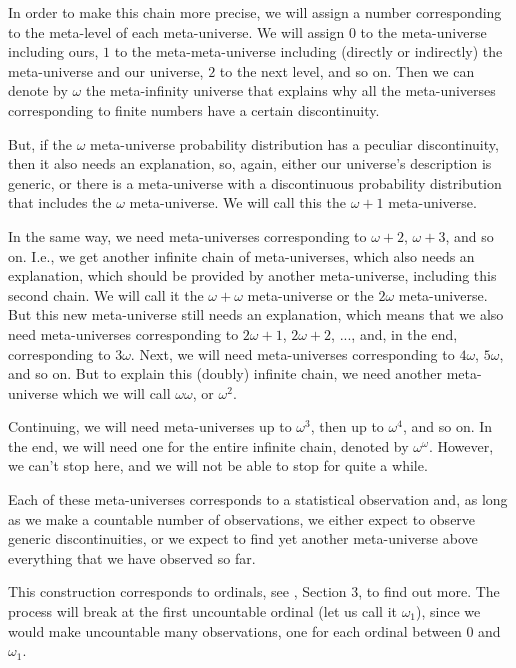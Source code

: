 \documentclass[a4paper
,draft
]{article}
\begin{document}
In order to make this chain more precise, we will assign a number corresponding
to the meta-level of each meta-universe.
We will assign $0$ to the meta-universe including ours, $1$ to the
meta-meta-universe including (directly or indirectly) the meta-universe and our
universe, $2$ to the next level, and so on.
Then we can denote by $\omega$ the meta-infinity universe that explains why all
the meta-universes corresponding to finite numbers have a certain discontinuity.

But, if the $\omega$ meta-universe probability distribution has a peculiar
discontinuity, then it also needs an explanation, so, again,
either our universe's
description is generic, or there is a meta-universe with a discontinuous
probability distribution that includes the
$\omega$ meta-universe.
We will call this the $\omega + 1$ meta-universe.

In the same way, we need meta-universes corresponding to $\omega + 2$,
$\omega + 3$, and so on.
I.e., we get another infinite chain of meta-universes, which also needs an
explanation, which should be provided by another meta-universe, including this
second chain. We will call it the $\omega + \omega$ meta-universe
or the $2\omega$ meta-universe.
But this new meta-universe still needs an explanation,
which means that we also need
meta-universes corresponding to $2\omega + 1$, $2\omega + 2$, ..., and,
in the end, corresponding to $3\omega$.
Next, we will need meta-universes
corresponding to $4\omega$, $5\omega$, and so on.
But to explain this (doubly) infinite chain,
we need another meta-universe which we
will call $\omega\omega$, or $\omega^2$.

Continuing, we will need meta-universes up to $\omega^3$, then up to
$\omega^4$, and so on.
In the end, we will need one for the entire
infinite chain, denoted by $\omega^\omega$.
However, we can't stop here, and we will not be able to stop for quite a while.

Each of these meta-universes corresponds to a statistical observation and,
as long as we make a countable number of observations, we either expect to
observe generic discontinuities, or we expect to find yet another meta-universe
above everything that we have observed so far.

This construction corresponds to ordinals, see \textcite{Cohen1966}, Section 3,
to find out more.
The process will break at the first uncountable ordinal (let us call it
$\omega_1$), since we would make
uncountable many observations, one for each ordinal between $0$ and $\omega_1$.
\end{document}
